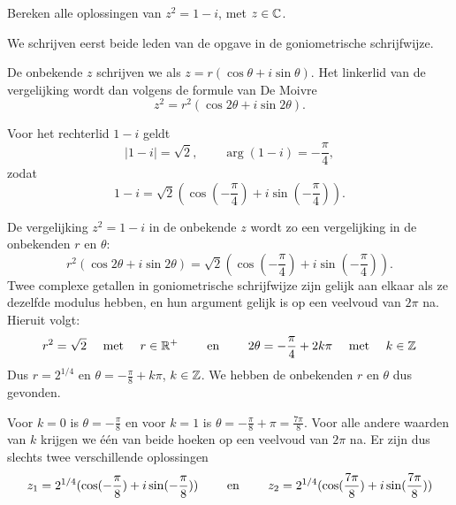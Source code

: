 \documentclass{ximera}
\begin{document}
\begin{exercise}
	Bereken alle oplossingen van $z^2 = 1 - i$, met $z \in \mathbb{C}$.
	\begin{oplossing}
		We schrijven eerst beide leden van de opgave in de goniometrische schrijfwijze.
		
		De onbekende $z$ schrijven we als $z = r(\cos\theta+i\sin\theta)$. Het linkerlid van de vergelijking wordt dan volgens de formule van De Moivre $$z^2 = r^2 (\cos 2\theta+i\sin 2\theta).$$
		
		Voor het rechterlid $1-i$ geldt
		\[ |1-i| = \sqrt{2}, \qquad \arg (1-i) = - \frac{\pi}{4}, \]
		zodat
		\[ 1-i = \sqrt{2}( \cos(-\frac{\pi}{4}) + i \sin(-\frac{\pi}{4})). \]
		
		De
		vergelijking $z^2 = 1-i$ in de onbekende $z$ wordt zo een vergelijking in de onbekenden $r$ en $\theta$:
		$$r^2 (\cos 2\theta+i\sin 2\theta) = \sqrt{2} ( \cos(-\frac{\pi}{4}) + i \sin(-\frac{\pi}{4})).$$
		Twee complexe getallen in goniometrische schrijfwijze zijn gelijk aan elkaar als ze dezelfde modulus hebben, en hun argument gelijk is op een veelvoud van $2 \pi$ na.
		Hieruit volgt:
		\[ r^2 = \sqrt{2} \quad \text{ met } \quad r\in \mathbb{R}^+ \qquad \text{ en } \qquad 2 \theta = - \frac{\pi}{4} + 2 k \pi \quad \text{ met } \quad k\in \mathbb{Z}\]
		Dus $r= 2^{1/4}$ en $\theta = - \frac{\pi}{8} + k \pi$, $k \in \mathbb{Z}$. We hebben de onbekenden $r$ en $\theta$ dus gevonden.
		
		 Voor $k=0$ is
		$\theta = - \frac{\pi}{8}$ en voor $k=1$ is $\theta = -
		\frac{\pi}{8} + \pi = \frac{7\pi}{8}$. Voor alle andere waarden van $k$ krijgen we één van beide hoeken op een veelvoud van $2 \pi$ na. Er zijn dus slechts twee verschillende oplossingen 
		\[ z_1 = 2^{1/4}( \cos(-\frac{\pi}{8}) + i \sin(-\frac{\pi}{8}))  \qquad \text{ en } \qquad
		z_2 = 2^{1/4}( \cos(\frac{7\pi}{8}) + i \sin(\frac{7\pi}{8}))  \]
		
	\end{oplossing}
\end{exercise}
\end{document}

